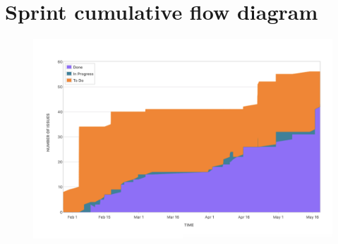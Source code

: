 
\chapter{Sprint cumulative flow diagram}
\label{appendix:sprints}
\begin{figure}[ht]
    \includegraphics[width=1.1\textwidth,center]{images/cumulative-flow-diagram.png}
\end{figure}
